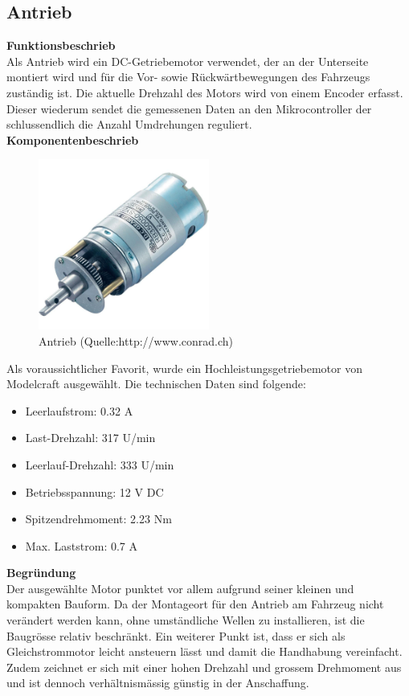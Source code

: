 \subsection{Antrieb}

\textbf{Funktionsbeschrieb}\\[0.2cm]
Als Antrieb wird ein DC-Getriebemotor verwendet, der an der Unterseite montiert wird und für die Vor- sowie Rückwärtbewegungen des Fahrzeugs zuständig ist.
Die aktuelle Drehzahl des Motors wird von einem Encoder erfasst. Dieser wiederum sendet die gemessenen Daten an den Mikrocontroller der schlussendlich die Anzahl Umdrehungen reguliert.\\[0.2cm]
\textbf{Komponentenbeschrieb}
\begin{figure}[H]
\centering
\includegraphics[width=0.5\textwidth]{03_Loesungskonzept/pictures/antrieb.jpg}
\caption{Antrieb  (Quelle:http://www.conrad.ch)}	
\end{figure}\flushleft
Als voraussichtlicher Favorit, wurde ein Hochleistungsgetriebemotor von Modelcraft ausgewählt. Die technischen Daten sind folgende:
\begin{itemize}
\item Leerlaufstrom: 0.32 A
\item Last-Drehzahl: 317 U/min
\item Leerlauf-Drehzahl: 333 U/min
\item Betriebsspannung: 12 V DC
\item Spitzendrehmoment: 2.23 Nm
\item Max. Laststrom: 0.7 A
\end{itemize}
\textbf{Begründung}\\[0.2cm]
Der ausgewählte Motor punktet vor allem aufgrund seiner kleinen und kompakten Bauform. Da der Montageort für den Antrieb am Fahrzeug nicht verändert werden kann, ohne umständliche Wellen zu installieren, ist die Baugrösse relativ beschränkt.
Ein weiterer Punkt ist, dass er sich als Gleichstrommotor leicht ansteuern lässt und damit die Handhabung vereinfacht.
Zudem zeichnet er sich mit einer hohen Drehzahl und grossem Drehmoment aus und ist dennoch verhältnismässig günstig in der Anschaffung.
